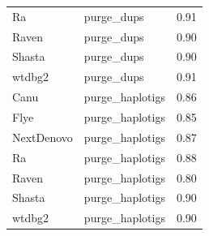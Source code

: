 \begin{table}[ht]
\begin{adjustbox}{totalheight=\baselineskip}
\begin{tabular}{llc}
Ra & purge\_dups & 0.91 \\
Raven & purge\_dups & 0.90 \\
Shasta & purge\_dups & 0.90 \\
wtdbg2 & purge\_dups & 0.91 \\
Canu & purge\_haplotigs & 0.86 \\
Flye & purge\_haplotigs & 0.85 \\
NextDenovo & purge\_haplotigs & 0.87 \\
Ra & purge\_haplotigs & 0.88 \\
Raven & purge\_haplotigs & 0.80 \\
Shasta & purge\_haplotigs & 0.90 \\
wtdbg2 & purge\_haplotigs & 0.90 \\
\hline
\end{tabular}
\end{adjustbox}
\label{tab:pacbio_happy_part1}
\end{table}

